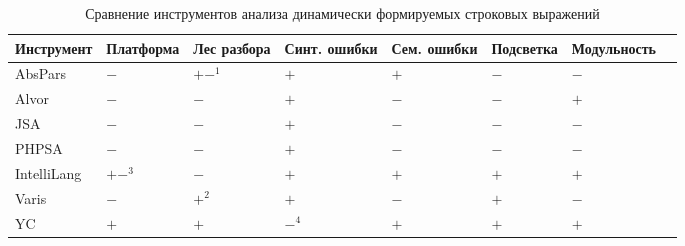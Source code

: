 \begin{table} [htbp]
  \centering
  \parbox{14cm}{\caption{Сравнение инструментов анализа динамически формируемых строковых выражений}\label{tbl:comparison}}
  \begin{tabular}{| p{2.6cm} || p{2cm} | p{1.8cm} | p{1.8cm} | p{1.8cm} | p{2cm} | p{2cm}l |}
  \hline                               
  \hline
  \small{Инструмент}   &\centering \small{Платформа} &\centering \small{Лес разбора}      &\centering \small{Синт. ошибки} &\centering \small{Сем. ошибки} &\centering \small{Подсветка} &\centering \small{Модульность} & \\
  \hline 
  AbsPars      &\centering  $-$      &\centering  $+-^1$                 &\centering  $+$                  &\centering  $+$                 &\centering  $-$                 &\centering  $-$        & \\
  Alvor        &\centering  $-$      &\centering  $-$                    &\centering  $+$                  &\centering  $-$                 &\centering  $-$                 &\centering  $+$        &\\
  JSA          &\centering  $-$      &\centering  $-$                    &\centering  $+$                  &\centering  $-$                 &\centering  $-$                 &\centering  $-$        &\\
  PHPSA        &\centering  $-$      &\centering  $-$                    &\centering  $+$                  &\centering  $-$                 &\centering  $-$                 &\centering  $-$        &\\
  IntelliLang  &\centering  $+-^3$   &\centering  $-$                    &\centering  $+$                  &\centering  $+$                 &\centering  $+$                 &\centering  $+$        &\\
  Varis        &\centering  $-$      &\centering  $+^2$                  &\centering  $+$                  &\centering  $-$                 &\centering  $+$                 &\centering  $-$        &\\
  YC           &\centering  $+$      &\centering  $+$                    &\centering  $-^4$                &\centering  $+$                 &\centering  $+$                 &\centering  $+$        &\\
  \hline
  \hline
  \end{tabular}
\end{table}

